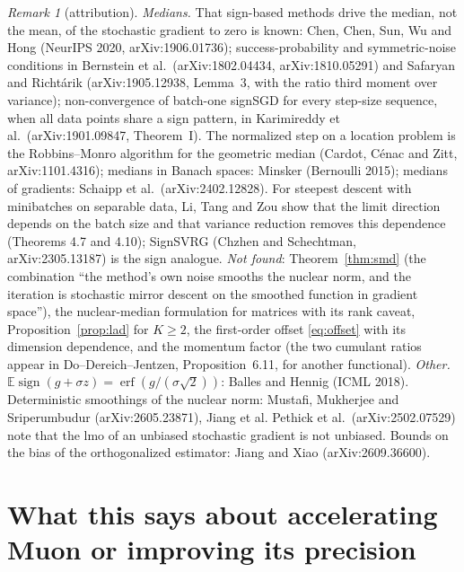 \documentclass[11pt]{article}
\theoremstyle{definition}
\theoremstyle{remark}
\newtheorem{remark}[theorem]{Remark}
\newcommand{\E}{\mathbb{E}}
\newcommand{\sign}{\operatorname{sign}}
\begin{document}
\begin{remark}[attribution]\label{rem:noise}
\emph{Medians.} That sign-based methods drive the median, not the mean, of the stochastic gradient to zero is known:
Chen, Chen, Sun, Wu and Hong (NeurIPS 2020, arXiv:1906.01736); success-probability and symmetric-noise conditions in
Bernstein et al.\ (arXiv:1802.04434, arXiv:1810.05291) and Safaryan and Richt\'arik (arXiv:1905.12938, Lemma~3, with the
ratio third moment over variance); non-convergence of batch-one signSGD for every step-size sequence, when all data
points share a sign pattern, in Karimireddy et al.\ (arXiv:1901.09847, Theorem~I). The normalized step on a location
problem is the Robbins--Monro algorithm for the
geometric median (Cardot, C\'enac and Zitt, arXiv:1101.4316); medians in Banach spaces: Minsker (Bernoulli 2015);
medians of gradients: Schaipp et al.\ (arXiv:2402.12828). For steepest descent with minibatches on separable data, Li,
Tang and Zou show that the limit direction depends on the batch size and that variance reduction removes this
dependence (Theorems 4.7 and 4.10); SignSVRG (Chzhen and Schechtman, arXiv:2305.13187) is the sign analogue.
\emph{Not found}: Theorem~\ref{thm:smd} (the combination ``the method's own noise smooths the nuclear norm, and the
iteration is stochastic mirror descent on the smoothed function in gradient space''), the nuclear-median formulation
for matrices with its rank caveat, Proposition~\ref{prop:lad} for $K\ge2$, the first-order offset \eqref{eq:offset} with
its dimension dependence, and the momentum factor (the two cumulant ratios appear in Do--Dereich--Jentzen,
Proposition~6.11, for another functional). \emph{Other.} $\E\sign(g+\sigma z)=\operatorname{erf}(g/(\sigma\sqrt2))$:
Balles and Hennig (ICML 2018). Deterministic smoothings of the nuclear norm: Mustafi, Mukherjee and Sriperumbudur
(arXiv:2605.23871), Jiang et al. Pethick et al.\ (arXiv:2502.07529) note that the lmo of an unbiased stochastic gradient
is not unbiased. Bounds on the bias of the orthogonalized estimator: Jiang and Xiao (arXiv:2609.36600).
\end{remark}

\section{What this says about accelerating Muon or improving its precision}\label{sec:use}
\end{document}
